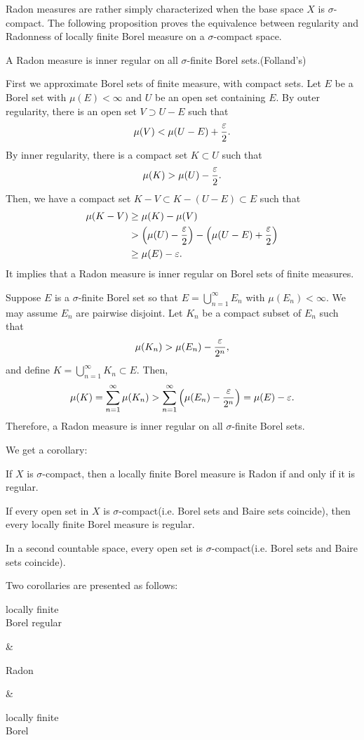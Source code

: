 \documentclass{../note}
\begin{document}
Radon measures are rather simply characterized when the base space $X$ is $\sigma$-compact.
The following proposition proves the equivalence between regularity and Radonness of locally finite Borel measure on a $\sigma$-compact space.
\begin{prop}
A Radon measure is inner regular on all $\sigma$-finite Borel sets.(Folland's)
\end{prop}
\begin{pf}
First we approximate Borel sets of finite measure, with compact sets.
Let $E$ be a Borel set with $\mu(E)<\infty$ and $U$ be an open set containing $E$.
By outer regularity, there is an open set $V\supset U-E$ such that
\[\mu(V)<\mu(U-E)+\frac{\varepsilon}2.\]
By inner regularity, there is a compact set $K\subset U$ such that
\[\mu(K)>\mu(U)-\frac{\varepsilon}2.\]
Then, we have a compact set $K-V\subset K-(U-E)\subset E$ such that
\begin{align*}
\mu(K-V)&\ge\mu(K)-\mu(V)\\
&>\left(\mu(U)-\frac{\varepsilon}2\right)-\left(\mu(U-E)+\frac{\varepsilon}2\right)\\
&\ge\mu(E)-\varepsilon.
\end{align*}
It implies that a Radon measure is inner regular on Borel sets of finite measures.

Suppose $E$ is a $\sigma$-finite Borel set so that $E=\bigcup_{n=1}^\infty E_n$ with $\mu(E_n)<\infty$.
We may assume $E_n$ are pairwise disjoint.
Let $K_n$ be a compact subset of $E_n$ such that
\[\mu(K_n)>\mu(E_n)-\frac{\varepsilon}{2^n},\]
and define $K=\bigcup_{n=1}^\infty K_n\subset E$.
Then,
\[\mu(K)=\sum_{n=1}^\infty\mu(K_n)>\sum_{n=1}^\infty\left(\mu(E_n)-\frac{\varepsilon}{2^n}\right)=\mu(E)-\varepsilon.\]
Therefore, a Radon measure is inner regular on all $\sigma$-finite Borel sets.
\end{pf}
We get a corollary:
\begin{cor}
If $X$ is $\sigma$-compact, then a locally finite Borel measure is Radon if and only if it is regular.
\end{cor}

\begin{thm}
If every open set in $X$ is $\sigma$-compact(i.e. Borel sets and Baire sets coincide), then every locally finite Borel measure is regular.
\end{thm}
\begin{prop}
In a second countable space, every open set is $\sigma$-compact(i.e. Borel sets and Baire sets coincide).
\end{prop}


Two corollaries are presented as follows:
\begin{rd}[column sep={120pt,between origins}]
\parbox{7em}{\centering locally finite \\ Borel regular} \rar &
\parbox{5em}{\centering Radon} \rar {} &
\parbox{7em}{\centering locally finite \\ Borel} 
\end{rd}
\end{document}
